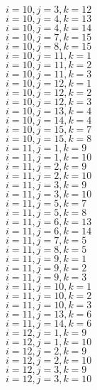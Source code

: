 \documentclass[14pt]{article}
\begin{document}
    $i=10,j=3,k=12 $ \\ 
    $i=10,j=4,k=13 $ \\ 
    $i=10,j=4,k=14 $ \\ 
    $i=10,j=7,k=15 $ \\ 
    $i=10,j=8,k=15 $ \\ 
    $i=10,j=11,k=1 $ \\ 
    $i=10,j=11,k=2 $ \\ 
    $i=10,j=11,k=3 $ \\ 
    $i=10,j=12,k=1 $ \\ 
    $i=10,j=12,k=2 $ \\ 
    $i=10,j=12,k=3 $ \\ 
    $i=10,j=13,k=4 $ \\ 
    $i=10,j=14,k=4 $ \\ 
    $i=10,j=15,k=7 $ \\ 
    $i=10,j=15,k=8 $ \\ 
    $i=11,j=1,k=9 $ \\ 
    $i=11,j=1,k=10 $ \\ 
    $i=11,j=2,k=9 $ \\ 
    $i=11,j=2,k=10 $ \\ 
    $i=11,j=3,k=9 $ \\ 
    $i=11,j=3,k=10 $ \\ 
    $i=11,j=5,k=7 $ \\ 
    $i=11,j=5,k=8 $ \\ 
    $i=11,j=6,k=13 $ \\ 
    $i=11,j=6,k=14 $ \\ 
    $i=11,j=7,k=5 $ \\ 
    $i=11,j=8,k=5 $ \\ 
    $i=11,j=9,k=1 $ \\ 
    $i=11,j=9,k=2 $ \\ 
    $i=11,j=9,k=3 $ \\ 
    $i=11,j=10,k=1 $ \\ 
    $i=11,j=10,k=2 $ \\ 
    $i=11,j=10,k=3 $ \\ 
    $i=11,j=13,k=6 $ \\ 
    $i=11,j=14,k=6 $ \\ 
    $i=12,j=1,k=9 $ \\ 
    $i=12,j=1,k=10 $ \\ 
    $i=12,j=2,k=9 $ \\ 
    $i=12,j=2,k=10 $ \\ 
    $i=12,j=3,k=9 $ \\ 
    $i=12,j=3,k=10 $ \\ 
\end{document}
